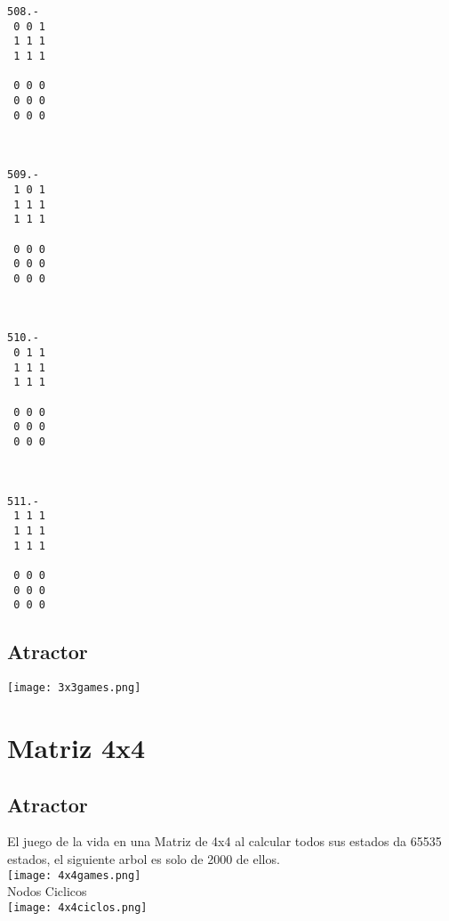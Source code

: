 \documentclass[a4paper,10pt]{article}
\begin{document}
\begin{multicols}{8}
\begin{verbatim}
508.-
 0 0 1
 1 1 1
 1 1 1

 0 0 0
 0 0 0
 0 0 0



509.-
 1 0 1
 1 1 1
 1 1 1

 0 0 0
 0 0 0
 0 0 0



510.-
 0 1 1
 1 1 1
 1 1 1

 0 0 0
 0 0 0
 0 0 0



511.-
 1 1 1
 1 1 1
 1 1 1

 0 0 0
 0 0 0
 0 0 0
\end{verbatim}

\end{multicols}

\subsection{Atractor}

\texttt{[image: 3x3games.png]}

\section{Matriz 4x4}
\subsection{Atractor}
El juego de la vida en una Matriz de 4x4 al calcular todos sus estados da 65535 estados, el siguiente arbol es solo de 2000 de ellos.\\
\texttt{[image: 4x4games.png]}
\\Nodos Ciclicos\\
\texttt{[image: 4x4ciclos.png]}
\end{document}
